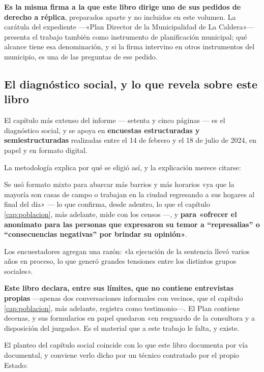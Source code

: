 \textbf{Es la misma firma a la que este libro dirige uno de sus pedidos de derecho a
réplica}, preparados aparte y no incluidos en este volumen. La carátula del expediente ---«Plan Director de la Municipalidad de La Caldera»--- presenta el trabajo también como instrumento de planificación municipal; qué alcance tiene esa denominación, y si la firma intervino en otros instrumentos del municipio, es una de las preguntas de ese pedido.

\subsection*{El diagnóstico social, y lo que revela sobre este libro}

El capítulo más extenso del informe --- setenta y cinco páginas --- es el diagnóstico social,
y se apoya en \textbf{encuestas estructuradas y semiestructuradas} realizadas entre el 14 de
febrero y el 18 de julio de 2024, en papel y en formato digital.

La metodología explica por qué se eligió así, y la explicación merece citarse:

\begin{cautela}
Se usó formato mixto para abarcar más barrios y más horarios «ya que la mayoría son casas de
campo o trabajan en la ciudad regresando a sus hogares al final del día» --- lo que confirma,
desde adentro, lo que el capítulo \ref{cap:poblacion}, más adelante, mide con los censos ---, y \textbf{para «ofrecer el
anonimato para las personas que expresaron su temor a “represalias” o “consecuencias
negativas” por brindar su opinión»}.

Los encuestadores agregan una razón: «la ejecución de la sentencia llevó varios años en
proceso, lo que generó grandes tensiones entre los distintos grupos sociales».

\textbf{Este libro declara, entre sus límites, que no contiene entrevistas propias} ---apenas dos conversaciones informales con vecinos, que el capítulo \ref{cap:poblacion}, más adelante, registra como testimonio---. El
Plan contiene decenas, y sus formularios en papel quedaron «en resguardo de la consultora y a
disposición del juzgado». Es el material que a este trabajo le falta, y existe.
\end{cautela}

El planteo del capítulo social coincide con lo que este libro documenta por vía documental, y
conviene verlo dicho por un técnico contratado por el propio Estado:

